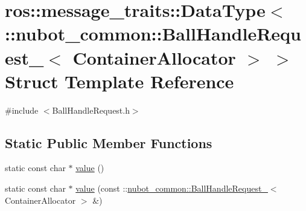 \hypertarget{structros_1_1message__traits_1_1DataType_3_01_1_1nubot__common_1_1BallHandleRequest___3_01ContainerAllocator_01_4_01_4}{\section{ros\-:\-:message\-\_\-traits\-:\-:Data\-Type$<$ \-:\-:nubot\-\_\-common\-:\-:Ball\-Handle\-Request\-\_\-$<$ Container\-Allocator $>$ $>$ Struct Template Reference}
\label{structros_1_1message__traits_1_1DataType_3_01_1_1nubot__common_1_1BallHandleRequest___3_01ContainerAllocator_01_4_01_4}
}


{\ttfamily \#include $<$Ball\-Handle\-Request.\-h$>$}

\subsection*{Static Public Member Functions}
\begin{DoxyCompactItemize}
\item 
static const char $\ast$ \hyperlink{structros_1_1message__traits_1_1DataType_3_01_1_1nubot__common_1_1BallHandleRequest___3_01ContainerAllocator_01_4_01_4_a13ca080ce768d8f69442b94834630592}{value} ()
\item 
static const char $\ast$ \hyperlink{structros_1_1message__traits_1_1DataType_3_01_1_1nubot__common_1_1BallHandleRequest___3_01ContainerAllocator_01_4_01_4_aafa4313e74c0a14ed589ff2749cd1b90}{value} (const \-::\hyperlink{structnubot__common_1_1BallHandleRequest__}{nubot\-\_\-common\-::\-Ball\-Handle\-Request\-\_\-}$<$ Container\-Allocator $>$ \&)
\end{DoxyCompactItemize}


